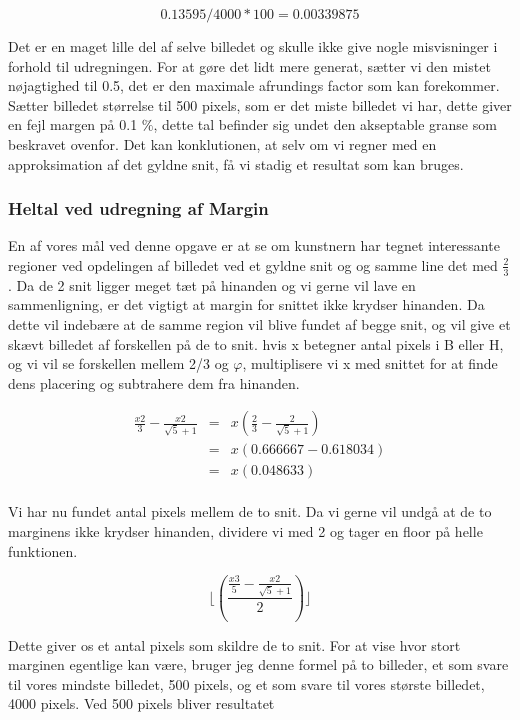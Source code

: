 \begin{equation}
	0.13595/4000*100 = 0.00339875
\end{equation}

Det er en maget lille del af selve billedet og skulle ikke give nogle
misvisninger i forhold til udregningen. For at gøre det lidt mere
generat, sætter vi den mistet nøjagtighed til 0.5, det er den maximale
afrundings factor som kan forekommer. Sætter billedet størrelse til 500
pixels, som er det miste billedet vi har, dette giver en fejl margen på
0.1 $\%$, dette tal befinder sig undet den akseptable granse som
beskravet ovenfor. Det kan konklutionen, at selv om vi regner med en
approksimation af det gyldne snit, få vi stadig et resultat som kan
bruges.

\subsubsection{Heltal ved udregning af Margin}
En af vores mål ved denne opgave er at se om kunstnern har tegnet
interessante regioner ved opdelingen af billedet ved et gyldne snit og og
samme line det med $\frac{2}{3}$. Da de 2 snit ligger meget tæt på
hinanden og vi gerne vil lave en sammenligning, er det vigtigt at margin
for snittet ikke krydser hinanden. Da dette vil indebære at de samme
region vil blive fundet af begge snit, og vil give et skævt billedet
af forskellen på de to snit.
hvis x betegner antal pixels i B eller H, og vi vil se
forskellen mellem 2/3 og $\varphi$, multiplisere vi x med snittet for at finde
dens placering og subtrahere dem fra hinanden.

\begin{eqnarray}
	\frac{x2}{3}-\frac{x2}{\sqrt{5}+1} &=& x(\frac{2}{3}-\frac{2}{\sqrt{5}+1}) \\ \nonumber
	&=& x(0.666667-0.618034) \\ \nonumber
	&=& x(0.048633) \\
\end{eqnarray}

Vi har nu fundet antal pixels mellem de to snit. Da vi gerne vil undgå at de to
marginens ikke krydser hinanden, dividere vi med 2 og tager en floor på
helle funktionen.

\begin{equation}
	\lfloor(\frac{\frac{x3}{5} - \frac{x2}{\sqrt{5}+1} }{2})\rfloor
\end{equation}

Dette giver os et antal pixels som skildre de to snit. For at vise
hvor stort marginen egentlige kan være, bruger jeg denne formel på to
billeder, et som svare til vores mindste billedet, 500 pixels, og et
som svare til vores største billedet, 4000 pixels. Ved 500 pixels
bliver resultatet

